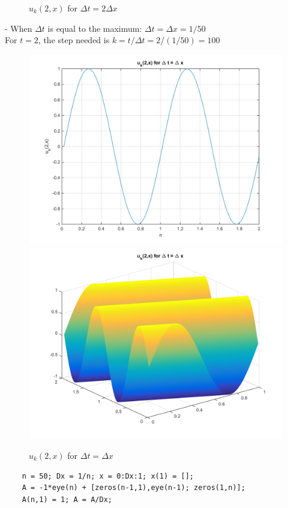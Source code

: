 \documentclass[14pt,a4paper]{article}
\begin{document}
\begin{enumerate}
\begin{figure}[htp]
		\caption{$u_k(2,x)$ for $\Delta t = 2\Delta x$}
	\end{figure}
	- When $\Delta t$ is equal to the maximum: $\Delta t = \Delta x = 1/50$\\
	For $t = 2$, the step needed is $k = t/\Delta t = 2/(1/50) = 100$
	\begin{figure}[htp]
		\centering
		\includegraphics[scale=0.4]{hw6_4d3.png}
		\includegraphics[scale=0.4]{hw6_4d4.png}
		\caption{$u_k(2,x)$ for $\Delta t = \Delta x$}
	\end{figure}
	
	\begin{lstlisting}
	n = 50; Dx = 1/n; x = 0:Dx:1; x(1) = [];
	A = -1*eye(n) + [zeros(n-1,1),eye(n-1); zeros(1,n)];
	A(n,1) = 1; A = A/Dx;
	

\end{lstlisting}
\end{enumerate}
\end{document}
